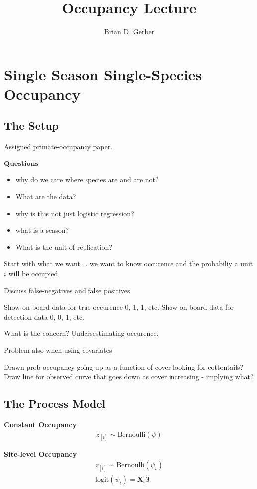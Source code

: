 \documentclass[12pt]{article}
\title{Occupancy Lecture}
\author{Brian D. Gerber}
\begin{document}
\maketitle

\section{Single Season Single-Species Occupancy}
\subsection{The Setup}

Assigned primate-occupancy paper.

\textbf{Questions}
\begin{itemize}
	\item why do we care where species are and are not?
	\item What are the data?
	\item why is this not just logistic regression?
	\item what is a season?
	\item What is the unit of replication?
\end{itemize}

Start with what we want.... we want to know occurence and the probabiliy a unit $i$ will be occupied

Discuss false-negatives and false positives

Show on board data for true occurence 0, 1, 1, etc.
Show on board data for detection data 0, 0, 1, etc.

What is the concern? Undersestimating occurence.

Problem also when using covariates

Drawn prob occupancy going up as a function of cover looking for cottontails?
Draw line for observed curve that goes down as cover increasing - implying what?


\subsection{The Process Model}

\textbf{Constant Occupancy}
\begin{align*}
z_{[i]} \sim \text{Bernoulli}(\psi)
\end{align*}


\noindent \textbf{Site-level Occupancy}
\begin{align*}
z_{[i]} \sim \text{Bernoulli}(\psi_{i})\\
\text{logit}(\psi_{i}) = \textbf{X}_{i}\boldsymbol{\beta}
\end{align*}
\end{document}
